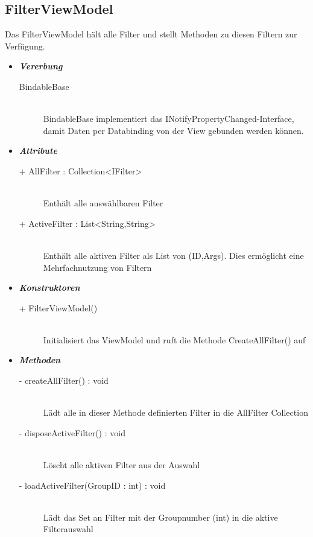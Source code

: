 \documentclass[13pt]{scrreprt}
\begin{document}
	\subsection{FilterViewModel}
	Das FilterViewModel hält alle Filter und stellt Methoden zu diesen Filtern zur Verfügung.
	\begin{itemize}[label = {$\circ$}]
		\item {\large \textbf{\textit{Vererbung}}\par}
		\begin{description}
			\item [BindableBase] \hfill \\ BindableBase implementiert das INotifyPropertyChanged-Interface, damit Daten per Databinding von der View gebunden werden können.
		\end{description}
		\item {\large \textbf{\textit{Attribute}}\par}
		\begin{description}
			\item [+ AllFilter : Collection<IFilter>] \hfill \\ Enthält alle auswählbaren Filter
			\item [+ ActiveFilter : List<String,String>] \hfill \\ Enthält alle aktiven Filter als List von (ID,Args). Dies ermöglicht eine Mehrfachnutzung von Filtern
		\end{description}
		\item {\large \textbf{\textit{Konstruktoren}}\par}
		\begin{description}
			\item [+ FilterViewModel()] \hfill \\ Initialisiert das ViewModel und ruft die Methode CreateAllFilter() auf
		\end{description}
	\newpage
		\item {\large \textbf{\textit{Methoden}}\par}
		\begin{description}
			\item [- createAllFilter() : void] \hfill \\ Lädt alle in dieser Methode definierten Filter in die AllFilter Collection
			\item [- disposeActiveFilter() : void] \hfill \\ Löscht alle aktiven Filter aus der Auswahl
			\item [- loadActiveFilter(GroupID : int) : void] \hfill \\ Lädt das Set an Filter mit der Groupnumber (int) in die aktive Filterauswahl

\end{description}
\end{itemize}
\end{document}
